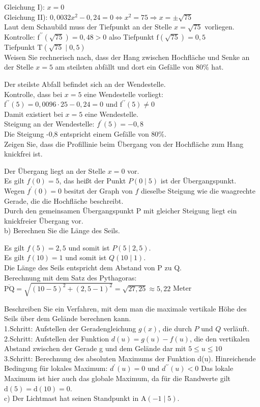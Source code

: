 \documentclass[10pt]{article}
\begin{document}
Gleichung I): $x=0$\\
Gleichung II): $0,0032 x^{2}-0,24=0 \Leftrightarrow x^{2}=75 \Rightarrow x= \pm \sqrt{75}$\\
Laut dem Schaubild muss der Tiefpunkt an der Stelle $x=\sqrt{75}$ vorliegen.\\
Kontrolle: $\mathrm{f}^{\prime \prime}(\sqrt{75})=0,48>0$ also Tiefpunkt $\mathrm{f}(\sqrt{75})=0,5$\\
Tiefpunkt $\mathrm{T}(\sqrt{75} \mid 0,5)$\\
Weisen Sie rechnerisch nach, dass der Hang zwischen Hochfläche und Senke an der Stelle $x=5$ am steilsten abfällt und dort ein Gefälle von $80 \%$ hat.

Der steilste Abfall befindet sich an der Wendestelle.\\
Kontrolle, dass bei $x=5$ eine Wendestelle vorliegt: $\mathrm{f}^{\prime \prime}(5)=0,0096 \cdot 25-0,24=0$ und $\mathrm{f}^{\prime \prime}(5) \neq 0$\\
Damit existiert bei $x=5$ eine Wendestelle.\\
Steigung an der Wendestelle: $f^{\prime}(5)=-0,8$\\
Die Steigung -0,8 entspricht einem Gefälle von $80 \%$.\\
Zeigen Sie, dass die Profillinie beim Übergang von der Hochfläche zum Hang knickfrei ist.

Der Übergang liegt an der Stelle $x=0$ vor.\\
Es gilt $f(0)=5$, das heißt der Punkt $P(0 \mid 5)$ ist der Übergangspunkt.\\
Wegen $f^{\prime}(0)=0$ besitzt der Graph von $f$ dieselbe Steigung wie die waagrechte Gerade, die die Hochfläche beschreibt.\\
Durch den gemeinsamen Übergangspunkt P mit gleicher Steigung liegt ein knickfreier Übergang vor.\\
b) Berechnen Sie die Länge des Seils.

Es gilt $f(5)=2,5$ und somit ist $P(5 \mid 2,5)$.\\
Es gilt $f(10)=1$ und somit ist $Q(10 \mid 1)$.\\
Die Länge des Seils entspricht dem Abstand von P zu Q.\\
Berechnung mit dem Satz des Pythagoras:\\
$\overline{\mathrm{PQ}}=\sqrt{(10-5)^{2}+(2,5-1)^{2}}=\sqrt{27,25} \approx 5,22$ Meter

Beschreiben Sie ein Verfahren, mit dem man die maximale vertikale Höhe des Seils über dem Gelände berechnen kann.\\
1.Schritt: Aufstellen der Geradengleichung $g(x)$, die durch $P$ und $Q$ verläuft.\\
2.Schritt: Aufstellen der Funktion $d(u)=g(u)-f(u)$, die den vertikalen Abstand zwischen der Gerade g und dem Gelände dar mit $5 \leq u \leq 10$\\
3.Schritt: Berechnung des absoluten Maximums der Funktion d(u). Hinreichende Bedingung für lokales Maximum: $d^{\prime}(u)=0$ und $d^{\prime \prime}(u)<0$ Das lokale Maximum ist hier auch das globale Maximum, da für die Randwerte gilt $\mathrm{d}(5)=\mathrm{d}(10)=0$.\\
c) Der Lichtmast hat seinen Standpunkt in $\mathrm{A}(-1 \mid 5)$.
\end{document}
